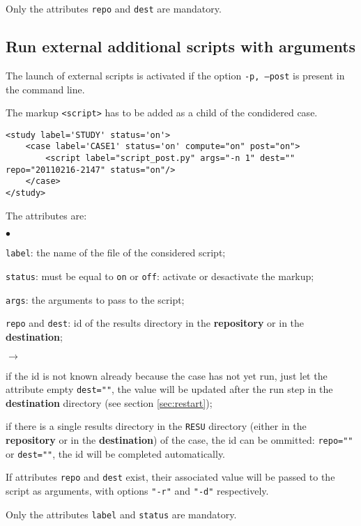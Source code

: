 \documentclass[a4paper,10pt,twoside]{article}
\begin{document}
Only the attributes \texttt{repo} and \texttt{dest} are mandatory.

\subsection{Run external additional scripts with arguments}

The launch of external scripts is activated if the option \texttt{-p, --post}
is present in the command line.

The markup \texttt{<script>} has to be added as a child of the condidered case.

\small
\begin{verbatim}
<study label='STUDY' status='on'>
    <case label='CASE1' status='on' compute="on" post="on">
        <script label="script_post.py" args="-n 1" dest="" repo="20110216-2147" status="on"/>
    </case>
</study>
\end{verbatim}
\normalsize

The attributes are:
\begin{list}{$\bullet$}{}
\item \texttt{label}: the name of the file of the considered script;
\item \texttt{status}: must be equal to \texttt{on} or \texttt{off}:
activate or desactivate the markup;
\item \texttt{args}: the arguments to pass to the script;
\item \texttt{repo} and \texttt{dest}: id of the results directory in the
\textbf{repository} or in the \textbf{destination};
\begin{list}{$\rightarrow$}{}
\item if the id is not known already because the case has not yet run, just let
the attribute empty \texttt{dest=""}, the value will be updated after the run
step in the \textbf{destination} directory (see section \ref{sec:restart});
\item if there is a single results directory in the \texttt{RESU} directory
(either in the \textbf{repository} or in the \textbf{destination}) of the case,
the id can be ommitted: \texttt{repo=""} or \texttt{dest=""}, the id will be
completed automatically.
\end{list}
If attributes \texttt{repo} and \texttt{dest} exist, their associated value
will be passed to the script as arguments, with options \texttt{"-r"} and
\texttt{"-d"} respectively.
\end{list}

Only the attributes \texttt{label} and \texttt{status} are mandatory.
\end{document}
